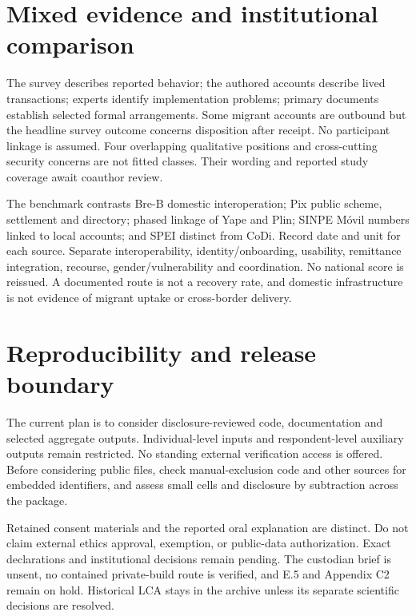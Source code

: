 \section{Mixed evidence and institutional comparison}
The survey describes reported behavior; the authored accounts describe lived transactions; experts identify implementation problems; primary documents establish selected formal arrangements. Some migrant accounts are outbound but the headline survey outcome concerns disposition after receipt. No participant linkage is assumed. Four overlapping qualitative positions and cross-cutting security concerns are not fitted classes. Their wording and reported study coverage await coauthor review.

The benchmark contrasts Bre-B domestic interoperation; Pix public scheme, settlement and directory; phased linkage of Yape and Plin; SINPE Móvil numbers linked to local accounts; and SPEI distinct from CoDi. Record date and unit for each source. Separate interoperability, identity/onboarding, usability, remittance integration, recourse, gender/vulnerability and coordination. No national score is reissued. A documented route is not a recovery rate, and domestic infrastructure is not evidence of migrant uptake or cross-border delivery.

\section{Reproducibility and release boundary}
The current plan is to consider disclosure-reviewed code, documentation and selected aggregate outputs. Individual-level inputs and respondent-level auxiliary outputs remain restricted. No standing external verification access is offered. Before considering public files, check manual-exclusion code and other sources for embedded identifiers, and assess small cells and disclosure by subtraction across the package.

Retained consent materials and the reported oral explanation are distinct. Do not claim external ethics approval, exemption, or public-data authorization. Exact declarations and institutional decisions remain pending. The custodian brief is unsent, no contained private-build route is verified, and E.5 and Appendix C2 remain on hold. Historical LCA stays in the archive unless its separate scientific decisions are resolved.
